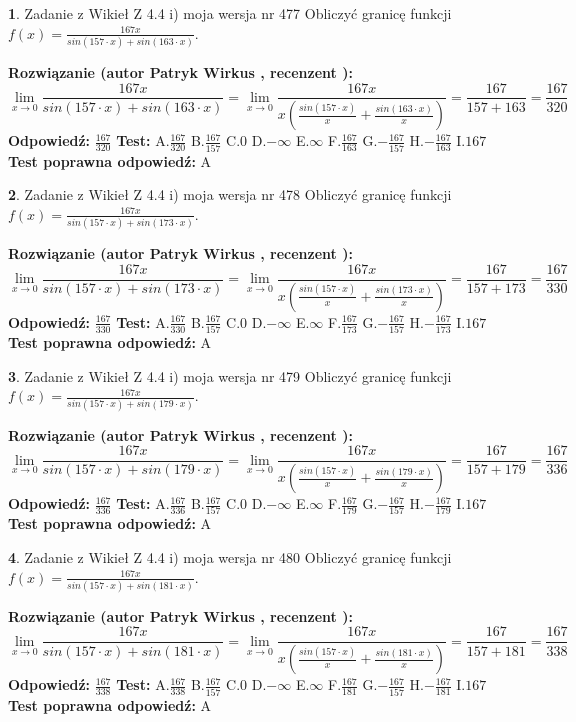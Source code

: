 \documentclass[12pt, a4paper]{article}
\theoremstyle{definition} %
\newtheorem{zad}{}
\newcommand{\zadStart}[1]{\begin{zad}#1\newline}
\newcommand{\zadStop}{\end{zad}}
\newcommand{\rozwStart}[2]{\noindent \textbf{Rozwiązanie (autor #1 , recenzent #2): }\newline}
\newcommand{\rozwStop}{\newline}
\newcommand{\odpStart}{\noindent \textbf{Odpowiedź:}\newline}
\newcommand{\odpStop}{\newline}
\newcommand{\testStart}{\noindent \textbf{Test:}\newline}
\newcommand{\testStop}{\newline}
\newcommand{\kluczStart}{\noindent \textbf{Test poprawna odpowiedź:}\newline}
\newcommand{\kluczStop}{\newline}
\begin{document}
\zadStart{Zadanie z Wikieł Z 4.4 i) moja wersja nr 477}
Obliczyć granicę funkcji $f(x)=\frac{167x}{sin(157\cdot x) +sin(163\cdot x)}$.
\zadStop
\rozwStart{Patryk Wirkus}{}
$$\lim\limits_{x\to 0}\frac{167x}{sin(157\cdot x) +sin(163\cdot x)}=\lim\limits_{x\to 0}\frac{167x}{x(\frac{sin(157\cdot x)}{x}+\frac{sin(163\cdot x)}{x})}=\frac{167}{157+163} = \frac{167}{320}$$
\rozwStop
\odpStart
$\frac{167}{320}$
\odpStop
\testStart
A.$\frac{167}{320}$
B.$\frac{167}{157}$
C.$0$
D.$-\infty$
E.$\infty$
F.$\frac{167}{163}$
G.$-\frac{167}{157}$
H.$-\frac{167}{163}$
I.$167$
\testStop
\kluczStart
A
\kluczStop



\zadStart{Zadanie z Wikieł Z 4.4 i) moja wersja nr 478}
Obliczyć granicę funkcji $f(x)=\frac{167x}{sin(157\cdot x) +sin(173\cdot x)}$.
\zadStop
\rozwStart{Patryk Wirkus}{}
$$\lim\limits_{x\to 0}\frac{167x}{sin(157\cdot x) +sin(173\cdot x)}=\lim\limits_{x\to 0}\frac{167x}{x(\frac{sin(157\cdot x)}{x}+\frac{sin(173\cdot x)}{x})}=\frac{167}{157+173} = \frac{167}{330}$$
\rozwStop
\odpStart
$\frac{167}{330}$
\odpStop
\testStart
A.$\frac{167}{330}$
B.$\frac{167}{157}$
C.$0$
D.$-\infty$
E.$\infty$
F.$\frac{167}{173}$
G.$-\frac{167}{157}$
H.$-\frac{167}{173}$
I.$167$
\testStop
\kluczStart
A
\kluczStop



\zadStart{Zadanie z Wikieł Z 4.4 i) moja wersja nr 479}
Obliczyć granicę funkcji $f(x)=\frac{167x}{sin(157\cdot x) +sin(179\cdot x)}$.
\zadStop
\rozwStart{Patryk Wirkus}{}
$$\lim\limits_{x\to 0}\frac{167x}{sin(157\cdot x) +sin(179\cdot x)}=\lim\limits_{x\to 0}\frac{167x}{x(\frac{sin(157\cdot x)}{x}+\frac{sin(179\cdot x)}{x})}=\frac{167}{157+179} = \frac{167}{336}$$
\rozwStop
\odpStart
$\frac{167}{336}$
\odpStop
\testStart
A.$\frac{167}{336}$
B.$\frac{167}{157}$
C.$0$
D.$-\infty$
E.$\infty$
F.$\frac{167}{179}$
G.$-\frac{167}{157}$
H.$-\frac{167}{179}$
I.$167$
\testStop
\kluczStart
A
\kluczStop



\zadStart{Zadanie z Wikieł Z 4.4 i) moja wersja nr 480}
Obliczyć granicę funkcji $f(x)=\frac{167x}{sin(157\cdot x) +sin(181\cdot x)}$.
\zadStop
\rozwStart{Patryk Wirkus}{}
$$\lim\limits_{x\to 0}\frac{167x}{sin(157\cdot x) +sin(181\cdot x)}=\lim\limits_{x\to 0}\frac{167x}{x(\frac{sin(157\cdot x)}{x}+\frac{sin(181\cdot x)}{x})}=\frac{167}{157+181} = \frac{167}{338}$$
\rozwStop
\odpStart
$\frac{167}{338}$
\odpStop
\testStart
A.$\frac{167}{338}$
B.$\frac{167}{157}$
C.$0$
D.$-\infty$
E.$\infty$
F.$\frac{167}{181}$
G.$-\frac{167}{157}$
H.$-\frac{167}{181}$
I.$167$
\testStop
\kluczStart
A
\kluczStop
\end{document}
